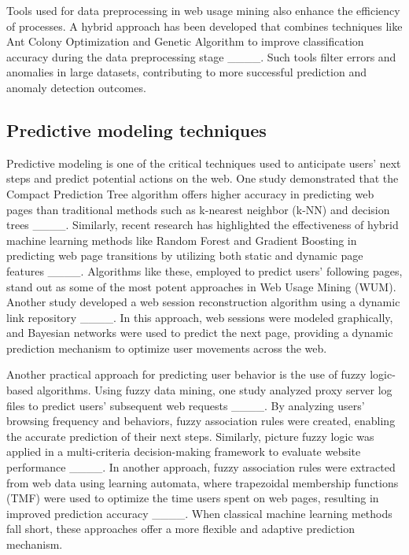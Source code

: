 Tools used for data preprocessing in web usage mining also enhance the efficiency of processes. A hybrid approach has been developed that combines techniques like Ant Colony Optimization and Genetic Algorithm to improve classification accuracy during the data preprocessing stage ____. Such tools filter errors and anomalies in large datasets, contributing to more successful prediction and anomaly detection outcomes.


\subsection{ Predictive modeling techniques}


Predictive modeling is one of the critical techniques used to anticipate users' next steps and predict potential actions on the web. One study demonstrated that the Compact Prediction Tree algorithm offers higher accuracy in predicting web pages than traditional methods such as k-nearest neighbor (k-NN) and decision trees ____. Similarly, recent research has highlighted the effectiveness of hybrid machine learning methods like Random Forest and Gradient Boosting in predicting web page transitions by utilizing both static and dynamic page features ____. Algorithms like these, employed to predict users' following pages, stand out as some of the most potent approaches in Web Usage Mining (WUM). Another study developed a web session reconstruction algorithm using a dynamic link repository ____. In this approach, web sessions were modeled graphically, and Bayesian networks were used to predict the next page, providing a dynamic prediction mechanism to optimize user movements across the web.

Another practical approach for predicting user behavior is the use of fuzzy logic-based algorithms. Using fuzzy data mining, one study analyzed proxy server log files to predict users' subsequent web requests ____. By analyzing users' browsing frequency and behaviors, fuzzy association rules were created, enabling the accurate prediction of their next steps. Similarly, picture fuzzy logic was applied in a multi-criteria decision-making framework to evaluate website performance ____. In another approach, fuzzy association rules were extracted from web data using learning automata, where trapezoidal membership functions (TMF) were used to optimize the time users spent on web pages, resulting in improved prediction accuracy ____. When classical machine learning methods fall short, these approaches offer a more flexible and adaptive prediction mechanism.

